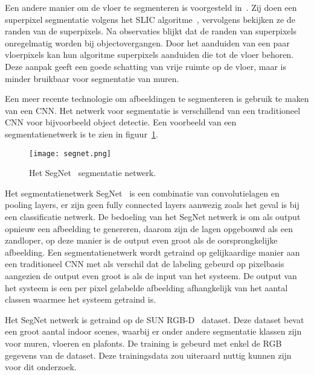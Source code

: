         Een andere manier om de vloer te segmenteren is voorgesteld in~\cite{Rodriguez-Telles2013}. Zij doen een superpixel segmentatie volgens het SLIC algoritme~\cite{slic}, vervolgens bekijken ze de randen van de superpixels.
        Na observaties blijkt dat de randen van superpixels onregelmatig worden bij objectovergangen. Door het aanduiden van een paar vloerpixels kan hun algoritme superpixels aanduiden die tot de vloer behoren.
        Deze aanpak geeft een goede schatting van vrije ruimte op de vloer, maar is minder bruikbaar voor segmentatie van muren.

        Een meer recente technologie om afbeeldingen te segmenteren is gebruik te maken van een CNN. Het netwerk voor segmentatie is verschillend van een traditioneel CNN voor bijvoorbeeld object detectie.
        Een voorbeeld van een segmentatienetwerk is te zien in figuur~\ref{fig:segnet_cnn}.

        \begin{figure}[!hb]
            \centering
            \texttt{[image: segnet.png]}
            \caption{Het SegNet~\cite{Badrinarayanan} segmentatie netwerk.}
            \label{fig:segnet_cnn}
        \end{figure}

        Het segmentatienetwerk SegNet~\cite{Badrinarayanan} is een combinatie van convolutielagen en pooling layers, er zijn geen fully connected layers aanwezig zoals het geval is bij een classificatie netwerk.
        De bedoeling van het SegNet netwerk is om als output opnieuw een afbeelding te genereren, daarom zijn de lagen opgebouwd als een zandloper, op deze manier is de output even groot als de oorsprongkelijke afbeelding.
        Een segmentatienetwerk wordt getraind op gelijkaardige manier aan een traditioneel CNN met als verschil dat de labeling gebeurd op pixelbasis aangezien de output even groot is als de input van het systeem.
        De output van het systeem is een per pixel gelabelde afbeelding afhangkelijk van het aantal classen waarmee het systeem getraind is.

        Het SegNet netwerk is getraind op de SUN RGB-D~\cite{Song_2015_CVPR} dataset. Deze dataset bevat een groot aantal indoor scenes, waarbij er onder andere segmentatie klassen zijn voor muren, vloeren en plafonts.
        De training is gebeurd met enkel de RGB gegevens van de dataset. Deze trainingsdata zou uiteraard nuttig kunnen zijn voor dit onderzoek.
